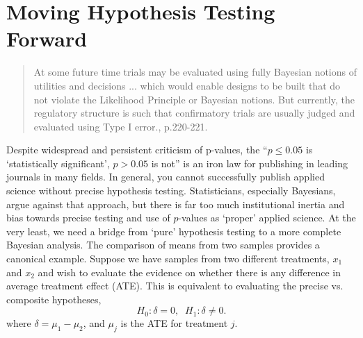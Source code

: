 \documentclass{juliacon}
\begin{document}
\section{Moving Hypothesis Testing Forward}
\label{sec:hypothesistest}

\begin{quote}
	At some future time trials may be evaluated using fully Bayesian notions of utilities and decisions ... which would enable designs to be built that do not violate the Likelihood Principle or Bayesian notions.  But currently, the regulatory structure is such that confirmatory trials are usually judged and evaluated using Type I error.\cite{Berry20ll}, p.220-221.
\end{quote}
\vskip 6pt
Despite widespread and persistent criticism of p-values,\cite{Berry2017} the ``$p \le 0.05$ is ‘statistically significant’, $p > 0.05$ is not'' is an iron law for publishing in leading journals in many fields. In general, you cannot successfully publish applied science without precise hypothesis testing.  Statisticians, especially Bayesians, argue against that approach, but there is far too much institutional inertia and bias towards precise testing and use of $p$-values as `proper’ applied science.  At the very least, we need a bridge from `pure’ hypothesis testing to a more complete Bayesian analysis.
\vskip 6pt
The comparison of means from two samples provides a canonical example. Suppose we have samples from two different treatments, $x_1$ and $x_2$ and wish to evaluate the evidence on whether there is any difference in average treatment effect (ATE).  This is equivalent to evaluating the precise vs. composite hypotheses,  
\begin{equation} 
H_0: \delta = 0, \; \; H_1: \delta \ne 0. 
\label{eq:hoh1}
\end{equation}
where $\delta = \mu_1 - \mu_2$, and $\mu_j$ is the ATE for treatment $j$.
\end{document}
